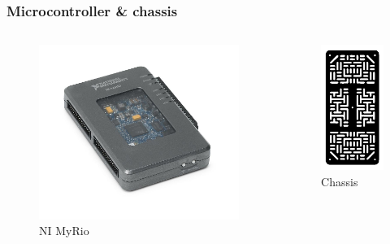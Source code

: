 \documentclass[aspectratio=169,kulak,t]{kulakbeamer} %
\begin{document}
\begin{frame}
	\frametitle{Microcontroller \& chassis}
	\begin{columns}
		\begin{figure}
			\centering
			\includegraphics[width=.7\textwidth]{NI-myrio}
			\caption{NI MyRio}
		\end{figure}
		\begin{figure}
			\centering
			\includegraphics[width=.7\textwidth]{chassis}
			\caption{Chassis}
		\end{figure}
		
	\end{columns}
	
\end{frame}
\end{document}

